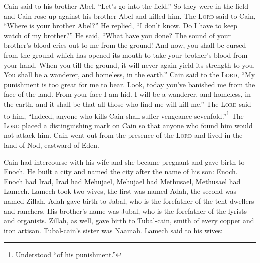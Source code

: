 \begin{inparaenum}
     Cain said to his brother Abel, ``Let's go into the field.'' So they were in the field and Cain rose up against his brother Abel and killed him.%
     The \textsc{Lord} said to Cain, ``Where is your brother Abel?'' He replied, ``I don't know. Do I have to keep watch of my brother?''%
     He said, ``What have you done? The sound of your brother's blood cries out to me from the ground!%
     And now, you shall be cursed from the ground which has opened its mouth to take your brother's blood from your hand.%
     When you till the ground, it will never again yield its strength to you. You shall be a wanderer, and homeless, in the earth.''%
     Cain said to the \textsc{Lord}, ``My punishment is too great for me to bear.%
     Look, today you've banished me from the face of the land. From your face I am hid. I will be a wanderer, and homeless, in the earth, and it shall be that all those who find me will kill me.''%
     The \textsc{Lord} said to him, ``Indeed, anyone who kills Cain shall suffer vengeance sevenfold.''\footnote{Understood ``of his punishment.''} The \textsc{Lord} placed a distinguishing mark on Cain so that anyone who found him would not attack him.%
     Cain went out from the presence of the \textsc{Lord} and lived in the land of Nod, eastward of Eden.%
    
     Cain had intercourse with his wife and she became pregnant and gave birth to Enoch. He built a city and named the city after the name of his son: Enoch.%
     Enoch had Irad, Irad had Mehujael, Mehujael had Methusael, Methusael had Lamech.%
     Lamech took two wives, the first was named Adah, the second was named Zillah.%
     Adah gave birth to Jabal, who is the forefather of the tent dwellers and ranchers.%
     His brother's name was Jubal, who is the forefather of the lyrists and organists.%
     Zillah, as well, gave birth to Tubal-cain, smith of every copper and iron artisan. Tubal-cain's sister was Naamah.%
     Lamech said to his wives:\smallskip%
    

\end{inparaenum}
